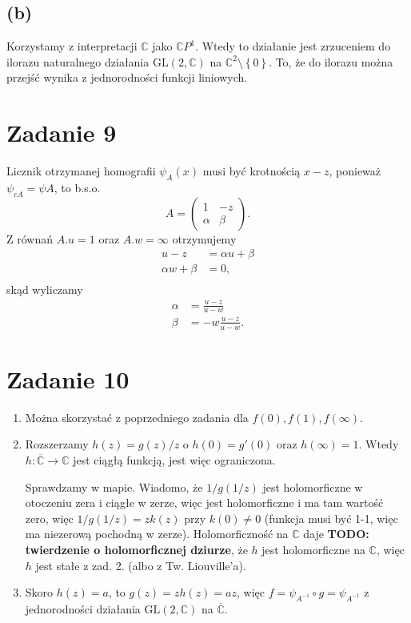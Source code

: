 \subsection*{(b)}

Korzystamy z interpretacji \( \mathbb{C} \) jako \( \mathbb{C}P^1 \). Wtedy to działanie jest zrzuceniem do ilorazu naturalnego działania \( \mathrm{GL}(2, \mathbb{C}) \) na \( \mathbb{C}^2 \setminus \left\{ 0 \right\} \). To, że do ilorazu można przejść wynika z jednorodności funkcji liniowych.


\section*{Zadanie 9}

Licznik otrzymanej homografii \( \psi_A(x) \) musi być krotnością \( x - z \), ponieważ \( \psi_{cA} = \psi{A} \), to b.s.o.
\[ 
    A =  
    \begin{pmatrix}
        1 & -z \\
        \alpha & \beta
    \end{pmatrix}.
\]
Z równań \( A.u = 1 \) oraz \( A.w = \infty \) otrzymujemy
\begin{align*}
    u - z &= \alpha u + \beta \\
    \alpha w + \beta &= 0, \\
\end{align*}
skąd wyliczamy
\begin{align*}
    \alpha &= \frac{u-z}{u - w} \\ 
    \beta &= -w\frac{u-z}{u-w}.
\end{align*}

\section*{Zadanie 10}

\begin{enumerate}
    \item Można skorzystać z poprzedniego zadania dla \( f(0), f(1), f(\infty) \).

    \item Rozszerzamy \( h(z) = g(z)/z \) o \( h(0) = g'(0) \) oraz \( h(\infty) = 1 \). Wtedy \( h: \overline{\mathbb{C}} \to \mathbb{C} \) jest ciągłą funkcją, jest więc ograniczona.

        Sprawdzamy w mapie. Wiadomo, że \( 1/g(1/z) \) jest holomorficzne w otoczeniu zera i ciągłe w zerze, więc jest holomorficzne i ma tam wartość zero, więc \( 1/g(1/z) = zk(z) \) przy \( k(0) \neq 0 \) (funkcja musi być 1-1, więc ma niezerową pochodną w zerze). Holomorficzność na \( \mathbb{C} \) daje \textbf{TODO: twierdzenie o holomorficznej dziurze}, że \( h \) jest holomorficzne na \( \mathbb{C} \), więc \( h \) jest stałe z zad. 2. (albo z Tw. Liouville'a).

    \item Skoro \( h(z) = a \), to \( g(z) = zh(z) = az \), więc \( f = \psi_{A^{-1}} \circ g = \psi_{A^{-1}}  \) z jednorodności działania \( \mathrm{GL}(2, \mathbb{C}) \) na \( \overline{\mathbb{C}} \).
\end{enumerate}

